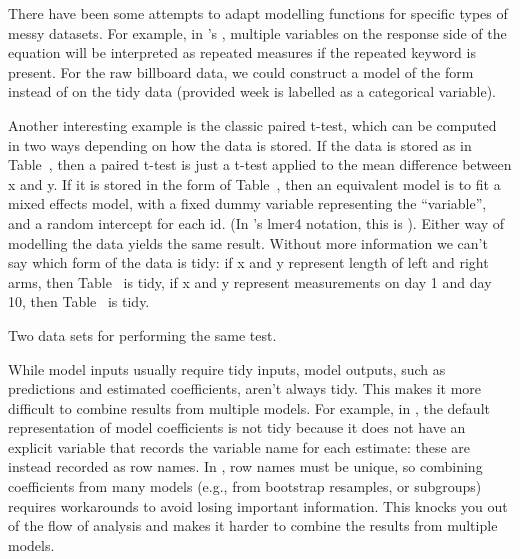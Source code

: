 \documentclass[article]{jss}
\begin{document}

There have been some attempts to adapt modelling functions for specific types of messy datasets. For example, in 's , multiple variables on the response side of the equation will be interpreted as repeated measures if the {\sc repeated} keyword is present. For the raw billboard data, we could construct a model of the form  instead of  on the tidy data (provided week is labelled as a categorical variable). 

Another interesting example is the classic paired t-test, which can be computed in two ways depending on how the data is stored. If the data is stored as in Table~, then a paired t-test is just a t-test applied to the mean difference between x and y. If it is stored in the form of Table~, then an equivalent model is to fit a mixed effects model, with a fixed dummy variable representing the ``variable'', and a random intercept for each id. (In 's lmer4 notation, this is ). Either way of modelling the data yields the same result. Without more information we can't say which form of the data is tidy: if x and y represent length of left and right arms, then Table~ is tidy, if x and y represent measurements on day 1 and day 10, then Table~ is tidy.

\begin{table}
  \centering
  \hspace{2em}%

  \caption{Two data sets for performing the same test.}
  \label{label}
\end{table}

While model inputs usually require tidy inputs, model outputs, such as predictions and estimated coefficients, aren't always tidy. This makes it more difficult to combine results from multiple models. For example, in , the default representation of model coefficients is not tidy because it does not have an explicit variable that records the variable name for each estimate: these are instead recorded as row names. In , row names must be unique, so combining coefficients from many models (e.g., from bootstrap resamples, or subgroups) requires workarounds to avoid losing important information. This knocks you out of the flow of analysis and makes it harder to combine the results from multiple models.
\end{document}
